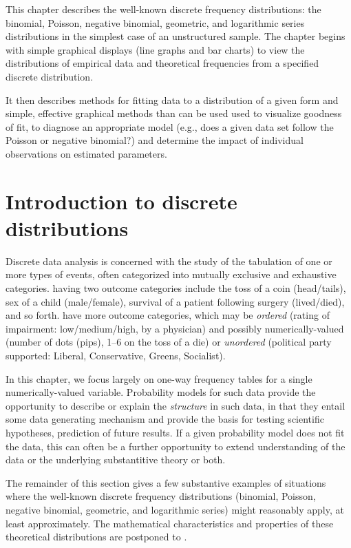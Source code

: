 \documentclass[11pt]{book}\usepackage[]{graphicx}\usepackage[]{color}
\begin{document}
This chapter describes the well-known discrete
frequency distributions: the binomial, Poisson, negative binomial,
geometric, and logarithmic series distributions in the simplest case of an unstructured sample.
The chapter begins with simple graphical displays (line graphs and bar charts) to view
the distributions of empirical data and theoretical frequencies from a specified
discrete distribution.

It then describes methods for fitting data to a distribution of a given form
and simple, effective
graphical methods than can be used used to visualize goodness of fit,
to diagnose an appropriate model (e.g., does a given data set follow the
Poisson or negative binomial?) and determine the impact of
individual observations on estimated parameters.

\section{Introduction to discrete distributions}\label{sec:discrete-intro}
Discrete data analysis is concerned with the study of the tabulation of one or
more types of events, often categorized into mutually exclusive and exhaustive
categories.   having two outcome categories include
the toss of a coin (head/tails), sex of a child (male/female), survival of
a patient following surgery (lived/died), and so forth.  
have more outcome categories, which may be \emph{ordered}
(rating of impairment: low/medium/high, by a physician)
and possibly numerically-valued 
(number of dots (pips), 1--6 on the toss of a die) 
or \emph{unordered} (political party supported: Liberal, Conservative, Greens, Socialist).

In this chapter, we focus largely on one-way frequency tables for a single 
numerically-valued variable.
Probability models for such data provide the opportunity to describe or explain
the \emph{structure} in such data, in that they entail some data generating 
mechanism and provide the basis for testing scientific hypotheses, prediction of
future results.  If a given probability model does not fit the data, this can often
be a further opportunity to extend understanding of the data or the underlying
substantitive theory or both.

The remainder of this section gives a few substantive examples of situations where the 
well-known discrete frequency distributions (binomial, Poisson, negative binomial,
geometric, and logarithmic series) might reasonably apply, at least approximately.
The mathematical characteristics and properties of these theoretical
distributions are postponed to .
\end{document}
